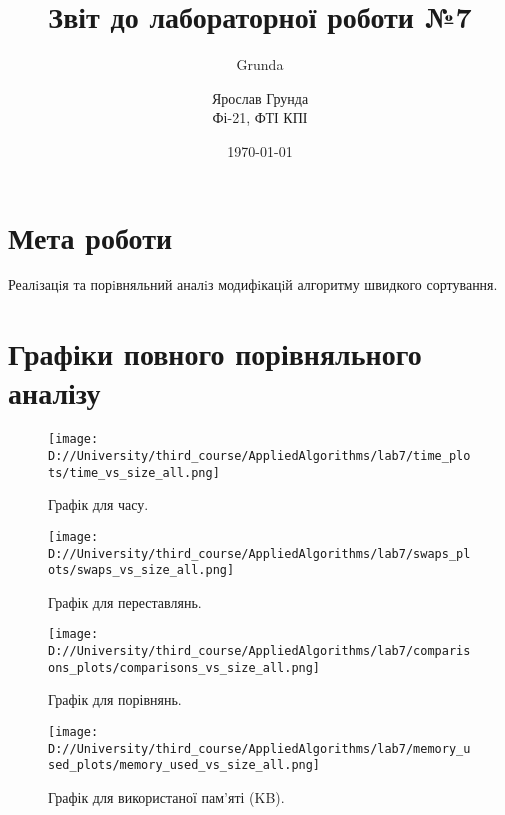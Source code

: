 \documentclass[a4paper,12pt]{article}
\author{Grunda}
\title{Звіт до лабораторної роботи №7}
\author{Ярослав Грунда \\ Фі-21, ФТІ КПІ}
\date{\today}
\begin{document}
\maketitle

\tableofcontents 
\newpage

\section{Мета роботи}
Реалiзацiя та порiвняльний аналiз модифiкацiй алгоритму швидкого сортування.
\section{Графіки повного порівняльного аналізу}
\begin{figure}[h!]
    \centering
    \texttt{[image: D://University/third\_course/AppliedAlgorithms/lab7/time\_plots/time\_vs\_size\_all.png]}
    \caption{Графік для часу.}
    \label{fig:time_chart}
\end{figure}
\newpage
\begin{figure}[h!]
    \centering
    \texttt{[image: D://University/third\_course/AppliedAlgorithms/lab7/swaps\_plots/swaps\_vs\_size\_all.png]}
    \caption{Графік для переставлянь.}
    \label{fig:swaps_chart}
\end{figure}
\newpage
\begin{figure}[h!]
    \centering
    \texttt{[image: D://University/third\_course/AppliedAlgorithms/lab7/comparisons\_plots/comparisons\_vs\_size\_all.png]}
    \caption{Графік для порівнянь.}
    \label{fig:comparison_chart}
\end{figure}
\newpage
\begin{figure}[h!]
    \centering
    \texttt{[image: D://University/third\_course/AppliedAlgorithms/lab7/memory\_used\_plots/memory\_used\_vs\_size\_all.png]}
    \caption{Графік для використаної пам'яті (KB).}
    \label{fig:memory_chart}
\end{figure}
\newpage
\end{document}
